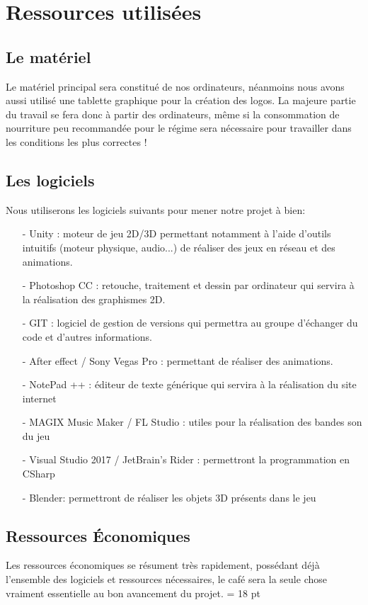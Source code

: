 \documentclass[12pt,a4paper]{article}
\begin{document}
\section{Ressources utilisées}
\subsection{Le matériel}
Le matériel principal sera constitué de nos ordinateurs, néanmoins nous avons aussi utilisé une tablette graphique
pour la création des logos.
La majeure partie du travail se fera donc à partir des ordinateurs, même si la consommation de nourriture
peu recommandée pour le régime sera nécessaire pour travailler dans les conditions les plus correctes !
\subsection{Les logiciels}
Nous utiliserons les logiciels suivants pour mener notre projet à bien:
\begin{itemize}
\item[-] Unity : moteur de jeu 2D/3D permettant notamment à l'aide d'outils
intuitifs (moteur physique, audio...) de réaliser des jeux en réseau et
des animations.
\item[-] Photoshop CC : retouche, traitement et dessin par
ordinateur qui servira à la réalisation des graphismes 2D.
\item[-] GIT : logiciel de gestion de versions qui permettra au groupe d'échanger du code et d’autres informations.
\item[-] After effect / Sony Vegas Pro : permettant de réaliser des animations.
\item[-] NotePad ++ : éditeur de texte générique qui servira à la réalisation
du site internet
\item[-] MAGIX Music Maker / FL Studio : utiles pour la
réalisation des bandes son du jeu
\item[-] Visual Studio 2017 / JetBrain's Rider : permettront la programmation en CSharp
\item[-] Blender: permettront de réaliser les objets 3D présents dans le jeu
\end{itemize}
\subsection{Ressources Économiques}
Les ressources économiques se résument très rapidement, possédant déjà l'ensemble des logiciels et ressources nécessaires, le café sera la seule chose vraiment essentielle au bon avancement du projet.
\newpage
\baselineskip = 18 pt
\end{document}
